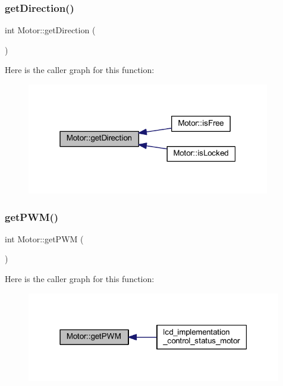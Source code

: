 \mbox{\label{class_motor_a0d8f99a56a3e07f49630e3024be91048}} 
\subsubsection{\texorpdfstring{get\+Direction()}{getDirection()}}
{\footnotesize\ttfamily int Motor\+::get\+Direction (\begin{DoxyParamCaption}{ }\end{DoxyParamCaption})}

Here is the caller graph for this function\+:\nopagebreak
\begin{figure}[H]
\begin{center}
\leavevmode
\includegraphics[width=301pt]{class_motor_a0d8f99a56a3e07f49630e3024be91048_icgraph}
\end{center}
\end{figure}
\mbox{\label{class_motor_accde7c9759aaef803f9d5d6d4ec229e6}} 
\subsubsection{\texorpdfstring{get\+P\+W\+M()}{getPWM()}}
{\footnotesize\ttfamily int Motor\+::get\+P\+WM (\begin{DoxyParamCaption}{ }\end{DoxyParamCaption})}

Here is the caller graph for this function\+:\nopagebreak
\begin{figure}[H]
\begin{center}
\leavevmode
\includegraphics[width=315pt]{class_motor_accde7c9759aaef803f9d5d6d4ec229e6_icgraph}
\end{center}
\end{figure}
\mbox{\label{class_motor_a4d03ea62bd9f5579d4fbe16d10462962}} 
